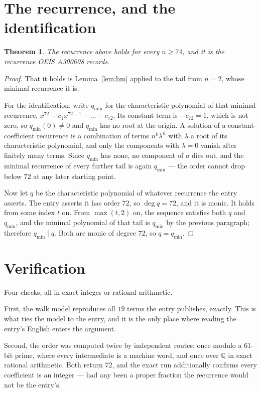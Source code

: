 \documentclass[11pt,a4paper]{article}
\theoremstyle{plain}
\newtheorem{theorem}{Theorem}
\theoremstyle{definition}
\begin{document}
\section{The recurrence, and the identification}

\begin{theorem}
The recurrence above holds for every $n\ge74$, and it is the recurrence OEIS A300608 records.
\end{theorem}

\begin{proof}
That it holds is Lemma~\ref{lem:bm} applied to the tail from $n=2$, whose minimal
recurrence it is.

For the identification, write $q_{\min}$ for the characteristic polynomial of that minimal
recurrence, $x^{72}-c_1x^{72-1}-\dots-c_{72}$. Its constant term is
$-c_{72}=1$, which is not zero, so $q_{\min}(0)\neq0$ and $q_{\min}$ has no
root at the origin. A solution of a constant-coefficient recurrence is a combination of terms
$n^{k}\lambda^{n}$ with $\lambda$ a root of its characteristic polynomial, and only the
components with $\lambda=0$ vanish after finitely many terms. Since $q_{\min}$ has none, no
component of $a$ dies out, and the minimal recurrence of every further tail is again
$q_{\min}$ --- the order cannot drop below $72$ at any later starting point.

Now let $q$ be the characteristic polynomial of whatever recurrence the entry asserts. The
entry asserts it has order $72$, so $\deg q=72$, and it is monic. It holds from some
index $t$ on. From $\max(t,2)$ on, the sequence satisfies both $q$ and $q_{\min}$, and
the minimal polynomial of that tail is $q_{\min}$ by the previous paragraph; therefore
$q_{\min}\mid q$. Both are monic of degree $72$, so $q=q_{\min}$.
\end{proof}

\section{Verification}

Four checks, all in exact integer or rational arithmetic.

First, the walk model reproduces all $19$ terms the entry publishes, exactly. This is
what ties the model to the entry, and it is the only place where reading the entry's English
enters the argument.

Second, the order was computed twice by independent routes: once modulo a $61$-bit prime, where
every intermediate is a machine word, and once over $\mathbb{Q}$ in exact rational arithmetic.
Both return $72$, and the exact run additionally confirms every coefficient is an integer
--- had any been a proper fraction the recurrence would not be the entry's.
\end{document}
